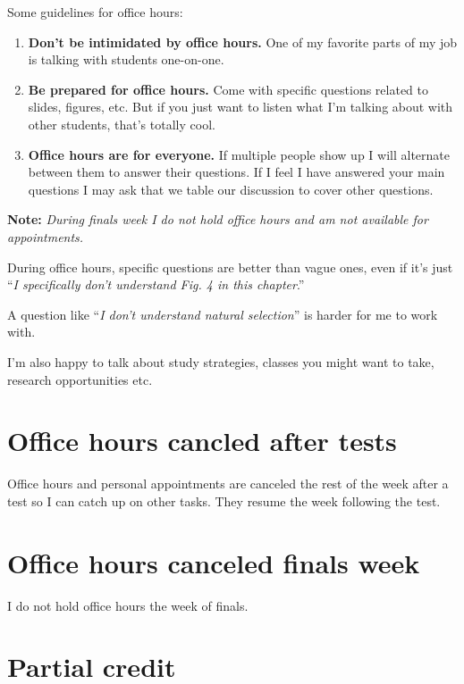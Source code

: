 \documentclass[
]{book}
\providecommand{\tightlist}{%
  \setlength{\itemsep}{0pt}\setlength{\parskip}{0pt}}
\begin{document}
Some guidelines for office hours:

\begin{enumerate}
\def\labelenumi{\arabic{enumi}.}
\tightlist
\item
  \textbf{Don't be intimidated by office hours.} One of my favorite parts of my job is talking with students one-on-one.
\item
  \textbf{Be prepared for office hours.} Come with specific questions related to slides, figures, etc. But if you just want to listen what I'm talking about with other students, that's totally cool.
\item
  \textbf{Office hours are for everyone.} If multiple people show up I will alternate between them to answer their questions. If I feel I have answered your main questions I may ask that we table our discussion to cover other questions.
\end{enumerate}

\textbf{Note:} \emph{During finals week I do not hold office hours and am not available for appointments.}

During office hours, specific questions are better than vague ones, even if it's just ``\emph{I specifically don't understand Fig. 4 in this chapter}.''

A question like ``\emph{I don't understand natural selection}'' is harder for me to work with.

I'm also happy to talk about study strategies, classes you might want to take, research opportunities etc.

\hypertarget{office-hours-cancled-after-tests}{%
\chapter{Office hours cancled after tests}\label{office-hours-cancled-after-tests}}

Office hours and personal appointments are canceled the rest of the week after a test so I can catch up on other tasks. They resume the week following the test.

\hypertarget{office-hours-canceled-finals-week}{%
\chapter{Office hours canceled finals week}\label{office-hours-canceled-finals-week}}

I do not hold office hours the week of finals.

\hypertarget{partial-credit}{%
\chapter{Partial credit}\label{partial-credit}}
\end{document}
